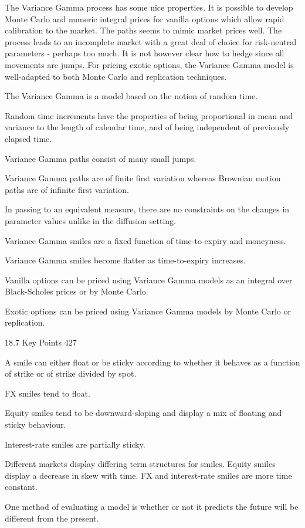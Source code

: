 The Variance Gamma process has some nice properties. It is possible to develop Monte Carlo and numeric integral prices for vanilla options which allow rapid calibration to the market. The paths seems to mimic market prices well. The process leads to an incomplete market with a great deal of choice for risk-neutral parameters - perhaps too much. It is not however clear how to hedge since all movements are jumps. For pricing exotic options, the Variance Gamma model is well-adapted to both Monte Carlo and replication techniques.

The Variance Gamma is a model based on the notion of random time.

Random time increments have the properties of being proportional in mean and variance to the length of calendar time, and of being independent of previously elapsed time.

Variance Gamma paths consist of many small jumps.

Variance Gamma paths are of finite first variation whereas Brownian motion paths are of infinite first variation.

In passing to an equivalent measure, there are no constraints on the changes in parameter values unlike in the diffusion setting.

Variance Gamma smiles are a fixed function of time-to-expiry and moneyness.

Variance Gamma smiles become flatter as time-to-expiry increases.

Vanilla options can be priced using Variance Gamma models as an integral over Black-Scholes prices or by Monte Carlo.

Exotic options can be priced using Variance Gamma models by Monte Carlo or replication.

18.7 Key Points 427

A smile can either float or be sticky according to whether it behaves as a function of strike or of strike divided by spot.

FX smiles tend to float.

Equity smiles tend to be downward-sloping and display a mix of floating and sticky behaviour.

Interest-rate smiles are partially sticky.

Different markets display differing term structures for smiles. Equity smiles display a decrease in skew with time. FX and interest-rate smiles are more time constant.

One method of evaluating a model is whether or not it predicts the future will be different from the present.

